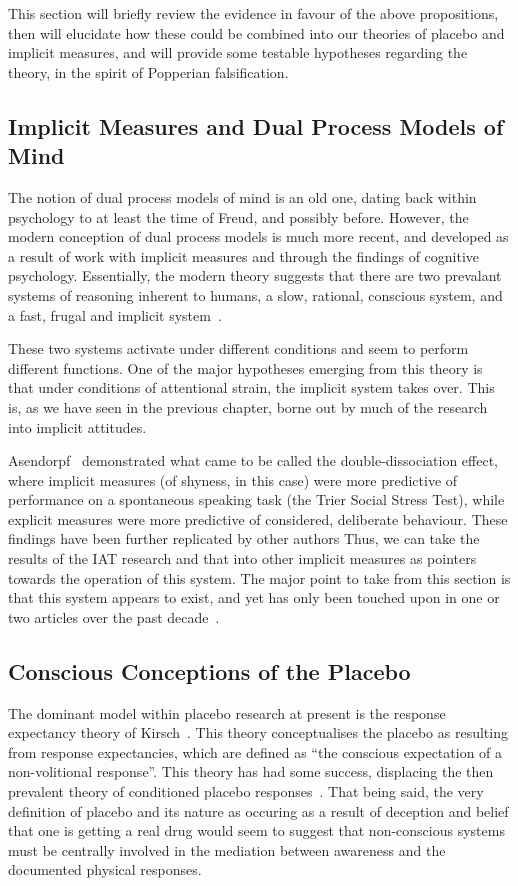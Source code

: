 This section will briefly review the evidence in favour of the above propositions, then will elucidate how these could be combined into our theories of placebo and implicit measures, and will provide some testable hypotheses regarding the theory, in the spirit of Popperian falsification.

\subsection{Implicit Measures and Dual Process Models of Mind}

The notion of dual process models of mind is an old one, dating back within psychology to at least the time of Freud, and possibly before. However, the modern conception of dual process models is much more recent, and developed as a result of work with implicit measures and through the findings of cognitive psychology. Essentially, the modern theory suggests that there are two prevalant systems of reasoning inherent to humans, a slow, rational, conscious system, and a fast, frugal and implicit system~\cite{Kahneman2002}. 

These two systems activate under different conditions and seem to perform different functions. One of the major hypotheses emerging from this theory is that under conditions of attentional strain, the implicit system takes over. This is, as we have seen in the previous chapter, borne out by much of the research into implicit attitudes. 

Asendorpf~\cite{Asendorpf2002} demonstrated what came to be called the double-dissociation effect, where implicit measures (of shyness, in this case) were more predictive of performance on a spontaneous speaking task (the Trier Social Stress Test), while explicit measures were more predictive of considered, deliberate behaviour. These findings have been further replicated by other authors   Thus, we can take the results of the IAT research and that into other implicit measures as pointers towards the operation of this system. The major point to take from this section is that this system appears to exist, and yet has only been touched upon in one or two articles over the past decade~\cite{Geers2005}. 

\subsection{Conscious Conceptions of the Placebo}

The dominant model within placebo research at present is the response expectancy theory of Kirsch~\cite{Kirsch1985, Kirsch1997a}. This theory conceptualises the placebo as resulting from response expectancies, which are defined as ``the conscious expectation of a non-volitional response''. This theory has had some success, displacing the then prevalent theory of conditioned placebo responses~\cite{Vuodouris1985}. That being said, the very definition of placebo and its nature as occuring as a result of deception and belief that one is getting a real drug would seem to suggest that non-conscious systems must be centrally involved in the mediation between awareness and the documented physical responses. 

